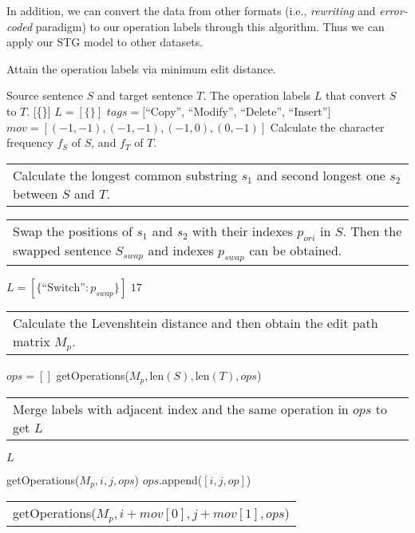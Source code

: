 \documentclass[11pt]{article}
\begin{document}
In addition, we can convert the data from other formats (i.e., \emph{rewriting} and \emph{error-coded} paradigm) to our operation labels through this algorithm. Thus we can apply our STG model to other datasets.

\makeatletter
\newcommand{\multiline}[1]{\begin{tabularx}{\dimexpr\linewidth-\ALG@thistlm}[t]{@{}X@{}}
    #1
  \end{tabularx}
}
\makeatother

\begin{algorithm}[ht]
    \small
    \caption{Attain the operation labels via minimum edit distance.}
    \begin{algorithmic}[1]
            Source sentence $S$ and target sentence $T$.
            The operation labels $L$ that convert $S$ to $T$.
             [\{\}]
        \EndIf
        \State $L = [\{\}]$
        \State $tags =  [$``Copy'', ``Modify'', ``Delete'', ``Insert''$]$
        \State $mov = [(-1, -1), (-1, -1), (-1, 0), (0, -1)]$
        \State Calculate the character frequency $f_S$ of $S$, and $f_T$ of $T$.
            \State \multiline{Calculate the longest common substring $s_1$ and second longest one $s_2$ between $S$ and $T$.} 
            \State \multiline{
            Swap the positions of $s_1$ and $s_2$ with their indexes $p_{ori}$ in $S$. Then the swapped sentence $S_{swap}$ and indexes $p_{swap}$ can be obtained.}
                \State $L = [\{\text{``Switch''}: p_{swap}\}]$
            \Else 
                 $17$
            \EndIf
        \Else
            \State \multiline{
            Calculate the Levenshtein distance and then obtain the edit path matrix $M_p$.}
\State $ops = []$
            \State getOperations($M_p, \text{len}(S), \text{len}(T), ops$)
            \State \multiline{Merge labels with adjacent index and the same operation in $ops$ to get $L$}
        \EndIf
         $L$
        
        \;
        
         getOperations($M_p, i, j, ops$)
            \EndIf
                    \State $ops$.append($[i, j, op]$)
                    \State \multiline{
                    getOperations($M_p, i + mov[0], j + mov[1], ops$)}
                \EndIf
            \EndFor
    \end{algorithmic}    
    \label{algo:minimal}
\end{algorithm}
  
\end{document}
